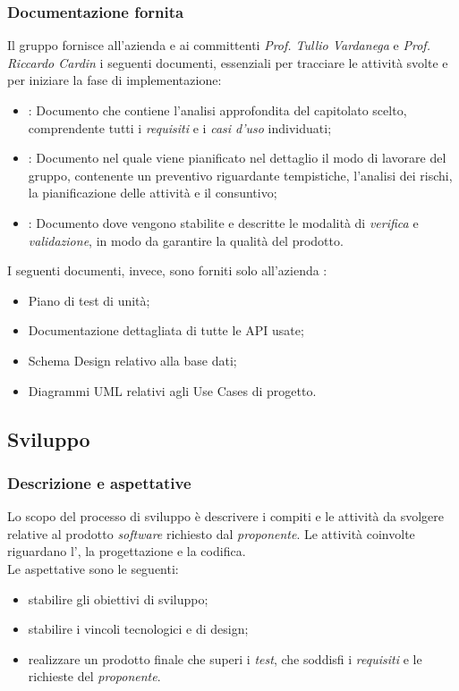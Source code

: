 \subsubsection{Documentazione fornita}
Il gruppo fornisce all'azienda \proponente{} e ai committenti \textit{Prof. Tullio Vardanega} e \textit{Prof. Riccardo Cardin} i seguenti documenti, essenziali per tracciare le attività svolte e per iniziare la fase di implementazione:
\begin{itemize}
	\item \AdR{}: Documento che contiene l'analisi approfondita del capitolato scelto, comprendente tutti i \emph{requisiti} e i \emph{casi d'uso} individuati;
	\item \PdP{}: Documento nel quale viene pianificato nel dettaglio il modo di lavorare del gruppo, contenente un preventivo riguardante tempistiche, l'analisi dei rischi, la pianificazione delle attività e il consuntivo;
	\item \PdQ{}: Documento dove vengono stabilite e descritte le modalità di \emph{verifica} e \emph{validazione}, in modo da garantire la qualità del prodotto.  \\
\end{itemize}
I seguenti documenti, invece, sono forniti solo all'azienda \proponente{}:
\begin{itemize}
	\item Piano di test di unità;
	\item Documentazione dettagliata di tutte le API usate;
	\item Schema Design relativo alla base dati;
	\item Diagrammi UML relativi agli Use Cases di progetto.
\end{itemize}

\subsection{Sviluppo}
\subsubsection{Descrizione e aspettative}
Lo scopo del processo di sviluppo è descrivere i compiti e le attività da svolgere relative al prodotto \emph{software} richiesto dal \emph{proponente}.
Le attività coinvolte riguardano l'\AdR{}, la progettazione e la codifica. \\
Le aspettative sono le seguenti:
\begin{itemize}
	\item stabilire gli obiettivi di sviluppo;
	\item stabilire i vincoli tecnologici e di design;
	\item realizzare un prodotto finale che superi i \emph{test}, che soddisfi i \emph{requisiti} e le richieste del \emph{proponente}. 
\end{itemize}

